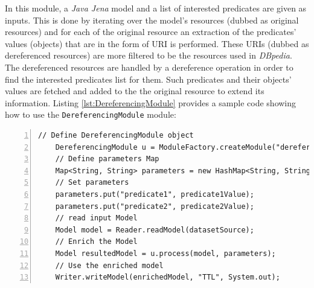 \documentclass[a4paper,twoside,bibtotoc,abstracton,12pt,BCOR=15mm]{article}
\begin{document}

    In this module, a \emph{Java Jena} model and a list of interested predicates are given as inputs.
    This is done by iterating over the model's resources (dubbed as original resources) 
    and for each of the original resource an extraction of the predicates' values (objects) that are in the form of URI is performed. 
    These URIs (dubbed as dereferenced resources) are more filtered to be the resources used in \emph{DBpedia}.
    The dereferenced resources are handled by a dereference operation in order to find the interested predicates list for them.
    Such predicates and their objects' values are fetched and added to the the original resource to extend its information.
    Listing \ref{lst:DereferencingModule} provides a sample code showing how to use the \texttt{DereferencingModule} module:

    \begin{lstlisting}[label=lst:DereferencingModule, float=tp, numbers=left, numberstyle=\tiny, caption = Code fragment to call the \texttt{DereferencingModule} class.]
    // Define DereferencingModule object
    DereferencingModule u = ModuleFactory.createModule("dereferencing");
    // Define parameters Map
    Map<String, String> parameters = new HashMap<String, String>();
    // Set parameters
    parameters.put("predicate1", predicate1Value);
    parameters.put("predicate2", predicate2Value);
    // read input Model
    Model model = Reader.readModel(datasetSource);
    // Enrich the Model
    Model resultedModel = u.process(model, parameters);
    // Use the enriched model
    Writer.writeModel(enrichedModel, "TTL", System.out);
    \end{lstlisting}
\end{document}
